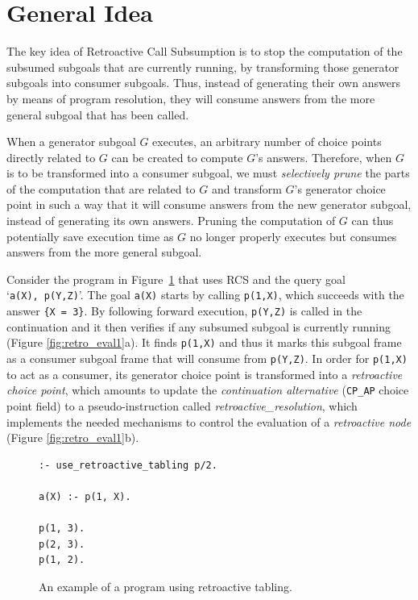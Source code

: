 \section{General Idea}

The key idea of Retroactive Call Subsumption is to stop the computation of the subsumed subgoals
that are currently running, by transforming those generator subgoals into consumer subgoals. Thus, instead
of generating their own answers by means of program resolution, they will consume answers from the more general
subgoal that has been called.

When a generator subgoal $G$ executes, an arbitrary number of choice points directly related to $G$
can be created to compute $G$'s answers. Therefore, when $G$ is to be
transformed into a consumer subgoal, we must \textit{selectively prune} the parts of the computation
that are related to $G$ and transform $G$'s generator choice point in such a way that it
will consume answers from the new generator subgoal, instead of generating its own answers.
Pruning the computation of $G$ can thus potentially save execution time as $G$ no longer properly executes
but consumes answers from the more general subgoal.

Consider the program in Figure~\ref{fig:retro_program1} that uses RCS and the query goal `\texttt{a(X),~p(Y,Z)}'.
The goal \texttt{a(X)} starts by calling \texttt{p(1,X)}, which succeeds with the answer \texttt{\{X~=~3\}}.
By following forward execution, \texttt{p(Y,Z)} is called in the continuation and it then verifies if any subsumed
subgoal is currently running (Figure \ref{fig:retro_eval1}a). It finds \texttt{p(1,X)} and thus it marks this
subgoal frame as a consumer subgoal frame that will consume from \texttt{p(Y,Z)}.
In order for \texttt{p(1,X)} to act as a consumer, its generator choice point is transformed into
a \textit{retroactive choice point}, which amounts to update the \textit{continuation alternative}
(\texttt{CP\_AP} choice point field) to a pseudo-instruction called \textit{retroactive\_resolution},
which implements the needed mechanisms to control the evaluation of a \textit{retroactive node}
(Figure \ref{fig:retro_eval1}b).

\begin{figure}[ht]
\begin{Verbatim}
:- use_retroactive_tabling p/2.

a(X) :- p(1, X).

p(1, 3).
p(2, 3).
p(1, 2).
\end{Verbatim}
\caption{An example of a program using retroactive tabling.}
\label{fig:retro_program1}
\end{figure}

